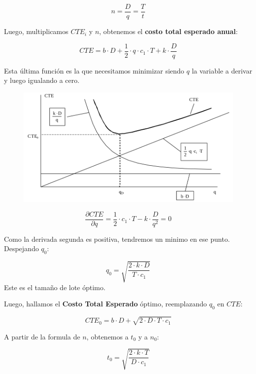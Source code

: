 \documentclass{article}
\begin{document}
\begin{equation}
    n=\frac{D}{q}=\frac{T}{t}
\end{equation}


Luego, multiplicamos \(CTE_i\) y \(n\), obtenemos el \textbf{costo total esperado anual}:


\begin{equation}
    CTE= b \cdot D +\frac{1}{2} \cdot q \cdot c_1 \cdot T + k \cdot \frac{D}{q}
\end{equation}


Esta última función es la que necesitamos minimizar siendo \(q\) la variable a derivar y 
luego igualando a cero.

\begin{figure}[h!]
    \includegraphics[width=\linewidth]{imagenes/stock-q-optimo.png}
\end{figure}

\[
    \frac{\partial CTE}{ \partial q} = \frac{1}{2} \cdot c_1 \cdot T - k \cdot \frac{D}{q^2} = 0
\]

Como la derivada segunda es positiva, tendremos un minimo en ese punto. Despejando \(q_0\):

\begin{equation}
    q_0 = \sqrt{\frac{2 \cdot k \cdot D}{T \cdot c_1}}
\end{equation}
Este es el tamaño de lote óptimo.

Luego, hallamos el \textbf{Costo Total Esperado} óptimo, reemplazando \(q_0\) en \(CTE\):

\begin{equation}
    CTE_0 = b \cdot D + \sqrt{2 \cdot D \cdot T \cdot c_1}
\end{equation}

A partir de la formula de \(n\), obtenemos a \(t_0\) y a \(n_0\):

\begin{equation}
    t_0 = \sqrt{\frac{2 \cdot k \cdot T}{D \cdot c_1}}
\end{equation}
\end{document}

